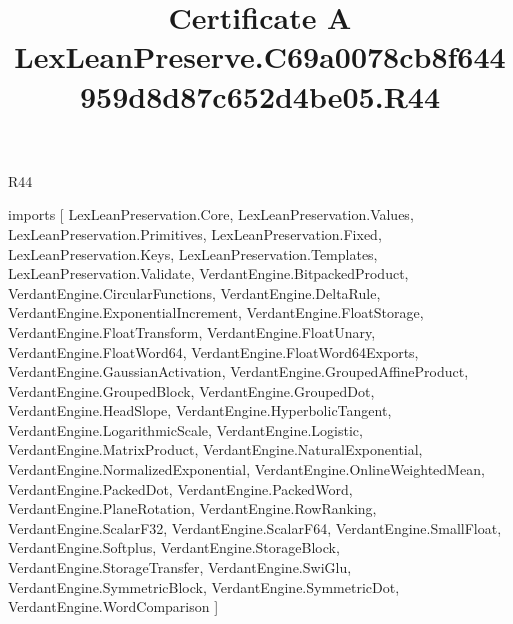 \begin{lexlean}{R44}
\title{Certificate A LexLeanPreserve.C69a0078cb8f644959d8d87c652d4be05.R44}
\begin{coremodule}
imports [
  LexLeanPreservation.Core,
  LexLeanPreservation.Values,
  LexLeanPreservation.Primitives,
  LexLeanPreservation.Fixed,
  LexLeanPreservation.Keys,
  LexLeanPreservation.Templates,
  LexLeanPreservation.Validate,
  VerdantEngine.BitpackedProduct,
  VerdantEngine.CircularFunctions,
  VerdantEngine.DeltaRule,
  VerdantEngine.ExponentialIncrement,
  VerdantEngine.FloatStorage,
  VerdantEngine.FloatTransform,
  VerdantEngine.FloatUnary,
  VerdantEngine.FloatWord64,
  VerdantEngine.FloatWord64Exports,
  VerdantEngine.GaussianActivation,
  VerdantEngine.GroupedAffineProduct,
  VerdantEngine.GroupedBlock,
  VerdantEngine.GroupedDot,
  VerdantEngine.HeadSlope,
  VerdantEngine.HyperbolicTangent,
  VerdantEngine.LogarithmicScale,
  VerdantEngine.Logistic,
  VerdantEngine.MatrixProduct,
  VerdantEngine.NaturalExponential,
  VerdantEngine.NormalizedExponential,
  VerdantEngine.OnlineWeightedMean,
  VerdantEngine.PackedDot,
  VerdantEngine.PackedWord,
  VerdantEngine.PlaneRotation,
  VerdantEngine.RowRanking,
  VerdantEngine.ScalarF32,
  VerdantEngine.ScalarF64,
  VerdantEngine.SmallFloat,
  VerdantEngine.Softplus,
  VerdantEngine.StorageBlock,
  VerdantEngine.StorageTransfer,
  VerdantEngine.SwiGlu,
  VerdantEngine.SymmetricBlock,
  VerdantEngine.SymmetricDot,
  VerdantEngine.WordComparison
]


\end{coremodule}
\end{lexlean}
